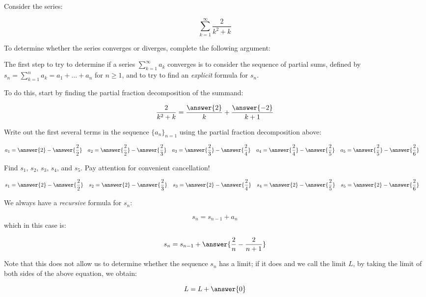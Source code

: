 \documentclass{ximera}
\author{Jim Talamo}
\begin{document}
\begin{exercise}
Consider the series:

\[
\sum_{k=1}^{\infty} \frac{2}{k^2+k}
\]

To determine whether the series converges or diverges, complete the following argument:

The first step to try to determine if a series $\sum_{k=1}^{\infty}a_k$ converges is to consider the sequence of partial sums, defined by $s_n = \sum_{k=1}^{n} a_k = a_1+\ldots + a_n$ for $n \geq 1$, and to try to find an \emph{explicit} formula for $s_n$.

To do this, start by finding the partial fraction decomposition of  the summand:

\[
 \frac{2}{k^2+k} = \frac{\answer{2}}{k}+\frac{\answer{-2}}{k+1}
\]

\begin{exercise}
Write out the first several terms in the sequence $\{a_n\}_{n=1}$ using the partial fraction decomposition above:

\begin{align*}
a_1 &= \answer{2} - \answer{\frac{2}{2}} & a_2 &= \answer{\frac{2}{2}}-\answer{\frac{2}{3}} & a_3 &= \answer{\frac{2}{3}}-\answer{\frac{2}{4}} & a_4 &= \answer{\frac{2}{4}}-\answer{\frac{2}{5}}& a_5 &= \answer{\frac{2}{5}}-\answer{\frac{2}{6}}
\end{align*}

\begin{exercise}
Find $s_1$, $s_2$, $s_3$, $s_4$, and $s_5$.  Pay attention for convenient cancellation!

\begin{align*}
s_1 &= \answer{2} - \answer{\frac{2}{2}} & s_2 &=  \answer{2}- \answer{\frac{2}{3}} & s_3 &=  \answer{2}- \answer{\frac{2}{4}} & s_4 &= \answer{2}-\answer{\frac{2}{5}}& s_5 &= \answer{2}-\answer{\frac{2}{6}} 
\end{align*}

\begin{exercise}
We always have a \emph{recursive} formula for $s_n$:

\[
s_n = s_{n-1} +a_n
\]
 which in this case is:
 
 \[
 s_n= s_{n-1} + \answer{\frac{2}{n}-\frac{2}{n+1}}
 \]
 
Note that this does not allow us to determine whether the sequence $s_n$ has a limit; if it does and we call the limit $L$, by taking the limit of both sides of the above equation, we obtain:

\[
L = L +\answer{0}
\]


\end{exercise}
\end{exercise}
\end{exercise}
\end{exercise}
\end{document}
